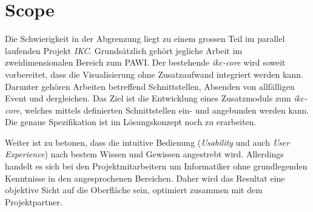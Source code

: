 \section{Scope}
\label{sec:scope}

Die Schwierigkeit in der Abgrenzung liegt zu einem grossen Teil im parallel laufenden Projekt \textit{IKC}. Grundsätzlich gehört jegliche Arbeit im zweidimensionalen Bereich zum PAWI. Der bestehende \textit{ikc-core} wird soweit vorbereitet, dass die Visualisierung ohne Zusatzaufwand integriert werden kann. Darunter gehören Arbeiten betreffend Schnittstellen, Absenden von allfälligen Event und dergleichen. Das Ziel ist die Entwicklung eines Zusatzmoduls zum \textit{ikc-core}, welches mittels definierten Schnittstellen ein- und angebunden werden kann. Die genaue Spezifikation ist im Lösungskonzept noch zu erarbeiten.

Weiter ist zu betonen, dass die intuitive Bedienung (\textit{Usability} und auch \textit{User Experience}) nach bestem Wissen und Gewissen angestrebt wird. Allerdings handelt es sich bei den Projektmitarbeitern um Informatiker ohne grundlegenden Kenntnisse in den angesprochenen Bereichen. Daher wird das Resultat eine objektive Sicht auf die Oberfläche sein, optimiert zusammen mit dem Projektpartner.

